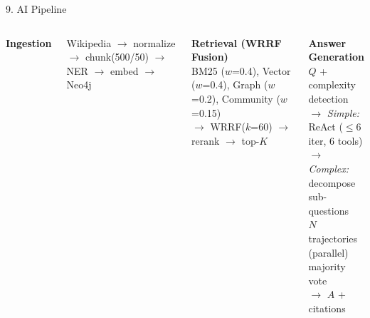 \documentclass[aspectratio=169]{beamer}
\begin{document}
\begin{frame}{9. AI Pipeline}
\begin{columns}[T]
\textbf{Ingestion}
\vspace{6pt}

{\small Wikipedia $\rightarrow$ normalize $\rightarrow$ chunk(500/50) $\rightarrow$ NER $\rightarrow$ embed $\rightarrow$ Neo4j}

\vspace{0.8em}
\textbf{Retrieval (WRRF Fusion)}\\[4pt]
{\small
BM25 ($w$=0.4), Vector ($w$=0.4), Graph ($w$=0.2), Community ($w$=0.15)\\[3pt]
$\rightarrow$ WRRF($k$=60) $\rightarrow$ rerank $\rightarrow$ top-$K$
}

\textbf{Answer Generation}\\[4pt]
{\small
$Q$ + complexity detection\\[3pt]
\quad $\rightarrow$ \textit{Simple:} ReAct ($\leq$6 iter, 6 tools)\\[3pt]
\quad $\rightarrow$ \textit{Complex:}\\
\quad\quad decompose sub-questions\\
\quad\quad $N$ trajectories (parallel)\\
\quad\quad majority vote\\
\quad\quad $\rightarrow$ $A$ + citations
}
\end{columns}
\end{frame}
\end{document}
